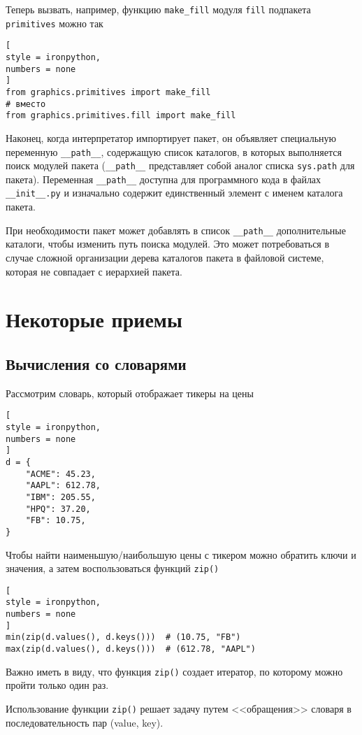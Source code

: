 \documentclass[%
	11pt,
	a4paper,
	utf8,
		]{article}
\begin{document}
Теперь вызвать, например, функцию \texttt{make\_fill} модуля \texttt{fill} подпакета \texttt{primitives} можно так
\begin{lstlisting}[
style = ironpython,
numbers = none
]
from graphics.primitives import make_fill
# вместо
from graphics.primitives.fill import make_fill
\end{lstlisting}

Наконец, когда интерпретатор импортирует пакет, он объявляет специальную переменную \verb|__path__|, содержащую список каталогов, в которых выполняется поиск модулей пакета (\verb|__path__| представляет собой аналог списка \texttt{sys.path} для пакета). Переменная \verb|__path__| доступна для программного кода в файлах \verb|__init__.py| и изначально содержит единственный элемент с именем каталога пакета.

При необходимости пакет может добавлять в список \verb|__path__| дополнительные каталоги, чтобы изменить путь поиска модулей. Это может потребоваться в случае сложной организации дерева каталогов пакета в файловой системе, которая не совпадает с иерархией пакета.

\section{Некоторые приемы}

\subsection{Вычисления со словарями}

Рассмотрим словарь, который отображает тикеры на цены
\begin{lstlisting}[
style = ironpython,
numbers = none
]
d = {
    "ACME": 45.23,
    "AAPL": 612.78,
    "IBM": 205.55,
    "HPQ": 37.20,
    "FB": 10.75,
}
\end{lstlisting}

Чтобы найти наименьшую/наибольшую цены с тикером можно обратить ключи и значения, а затем воспользоваться функций \texttt{zip()}
\begin{lstlisting}[
style = ironpython,
numbers = none
]
min(zip(d.values(), d.keys()))  # (10.75, "FB")
max(zip(d.values(), d.keys()))  # (612.78, "AAPL")
\end{lstlisting}

Важно иметь в виду, что функция \texttt{zip()} создает итератор, по которому можно пройти только один раз.

Использование функции \texttt{zip()} решает задачу путем <<обращения>> словаря в последовательность пар (value, key). 
\end{document}
